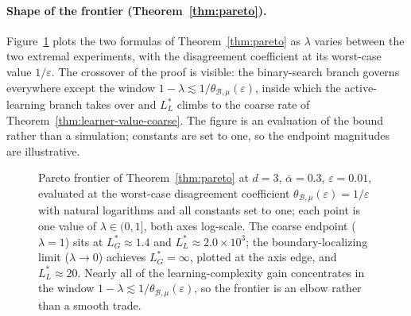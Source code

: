 \documentclass[runningheads,envcountsame]{llncs}
\newcommand{\cB}{\mathcal{B}}
\newcommand{\cE}{\mathcal{E}}
\newcommand{\eps}{\varepsilon}
\newcommand{\dis}{\theta}
\begin{document}
\paragraph{Shape of the frontier (Theorem~\ref{thm:pareto}).} Figure~\ref{fig:synthetic} plots the two formulas of Theorem~\ref{thm:pareto} as $\lambda$ varies between the two extremal experiments, with the disagreement coefficient at its worst-case value $1/\eps$. The crossover of the proof is visible: the binary-search branch governs everywhere except the window $1 - \lambda \lesssim 1/\dis_{\cB,\mu}(\eps)$, inside which the active-learning branch takes over and $L^*_L$ climbs to the coarse rate of Theorem~\ref{thm:learner-value-coarse}. The figure is an evaluation of the bound rather than a simulation; constants are set to one, so the endpoint magnitudes are illustrative.

\begin{figure}[t]
\centering
\begin{minipage}[t]{0.6\textwidth}
\centering
{}
\end{minipage}
\caption{Pareto frontier of Theorem~\ref{thm:pareto} at $d=3$, $\bar\alpha=0.3$, $\eps=0.01$, evaluated at the worst-case disagreement coefficient $\dis_{\cB,\mu}(\eps) = 1/\eps$ with natural logarithms and all constants set to one; each point is one value of $\lambda \in (0,1]$, both axes log-scale. The coarse endpoint ($\lambda{=}1$) sits at $L^*_G \approx 1.4$ and $L^*_L \approx 2.0 \times 10^3$; the boundary-localizing limit ($\lambda \to 0$) achieves $L^*_G = \infty$, plotted at the axis edge, and $L^*_L \approx 20$. Nearly all of the learning-complexity gain concentrates in the window $1 - \lambda \lesssim 1/\dis_{\cB,\mu}(\eps)$, so the frontier is an elbow rather than a smooth trade.}
\label{fig:synthetic}
\end{figure}
\end{document}
